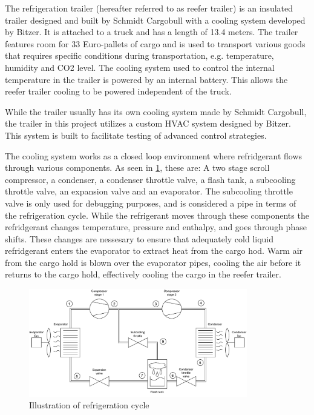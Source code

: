 The refrigeration trailer (hereafter referred to as reefer trailer) is an insulated trailer designed and built by Schmidt Cargobull with a cooling system developed by Bitzer. It is attached to a truck and has a length of 13.4 meters. The trailer features room for 33 Euro-pallets of cargo and is used to transport various goods that requires specific  conditions during transportation, e.g. temperature, humidity and CO2 level. The cooling system used to control the internal temperature in the trailer is powered by an internal battery. This allows the reefer trailer cooling to be powered independent of the truck.

While the trailer usually has its own cooling system made by Schmidt Cargobull, the trailer in this project utilizes a custom HVAC system designed by Bitzer. This system is built to facilitate testing of advanced control strategies.

The cooling system works as a closed loop environment where refridgerant flows through various components. As seen in \cref{fig:HVAC_Diagram}, these are: A two stage scroll compressor, a condenser, a condenser throttle valve, a flash tank, a subcooling throttle valve, an expansion valve and an evaporator. The subcooling throttle valve is only used for debugging purposes, and is considered a pipe in terms of the refrigeration cycle.
While the refrigerant moves through these components the refridgerant changes temperature, pressure and enthalpy, and goes through phase shifts. These changes are nessesary to ensure that adequately cold liquid refridgerant enters the evaporator to extract heat from the cargo hod. Warm air from the cargo hold is blown over the evaporator pipes, cooling the air before it returns to the cargo hold, effectively cooling the cargo in the reefer trailer. 


\begin{figure}[h!]
	\centering
	\includegraphics[width=0.85\textwidth]{Graphics/HVAC_Diagram_Fans.pdf}
	\caption{Illustration of refrigeration cycle}
	\label{fig:HVAC_Diagram}
\end{figure}


